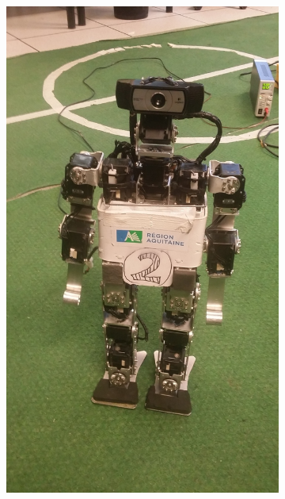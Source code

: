 \begin{figure}[htb]
\begin{subfigure}{0.3\paperwidth}
        \includegraphics[angle=-90,width=0.9\linewidth]{../media/sigmaban_1_3.jpg}
    \end{subfigure}
    \begin{subfigure}{0.3\paperwidth}
        \centering

\end{subfigure}
\end{figure}
